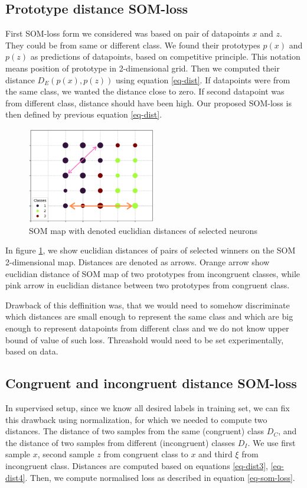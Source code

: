 \subsection{Prototype distance SOM-loss}
\label{loss-prop1}
First SOM-loss form we considered was based on pair of datapoints $x$ and $z$. They could be from same or different class. We found their prototypes $p(x)$ and $p(z)$ as predictions of datapoints, based on competitive principle. This notation means position of prototype in 2-dimensional grid. Then we computed their distance $D_E(p(x), p(z))$ using equation \ref{eq-dist}. If datapoints were from the same class, we wanted the distance close to zero. If second datapoint was from different class, distance should have been high. Our proposed SOM-loss is then defined by previous equation \ref{eq-dist}.

\begin{figure}[h!]
    \centering
    \includegraphics[width=0.5\textwidth]{figs/som-with-distances.png}
    \caption{SOM map with denoted euclidian distances of selected neurons}
    \label{fig:som-with-distances}
\end{figure}

In figure \ref{fig:som-with-distances}, we show euclidian distances of pairs of selected winners on the SOM 2-dimensional map. Distances are denoted as arrows. Orange arrow show euclidian distance of SOM map of two prototypes from incongruent classes, while pink arrow in euclidian distance between two prototypes from congruent class.

Drawback of this deffinition was, that we would need to somehow discriminate which distances are small enough to represent the same class and which are big enough to represent datapoints from different class and we do not know upper bound of value of such loss. Threashold would need to be set experimentally, based on data.


\newpage
\subsection{Congruent and incongruent distance SOM-loss}
\label{loss-final}
In supervised setup, since we know all desired labels in training set, we can fix this drawback using normalization, for which we needed to compute two distances. The distance of two samples from the same (congruent) class $D_C$, and the distance of two samples from different (incongruent) classes $D_I$. We use first sample $x$, second sample $z$ from congruent class to $x$ and third $\xi$ from incongruent class. Distances are computed based on equations \ref{eq-dist3}, \ref{eq-dist4}. Then, we compute normalised loss as described in equation \ref{eq-som-loss}.

